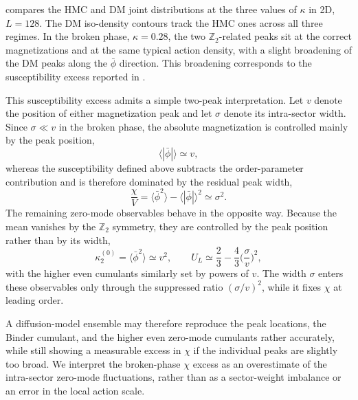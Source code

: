 \documentclass[reprint,twocolumn,superscriptaddress,preprintnumbers,amsmath,amssymb,aps,prd,floatfix]{revtex4-2}
\begin{document}
 compares the HMC and DM joint distributions at the three values of $\kappa$ in 2D, $L=128$. The DM iso-density contours track the HMC ones across all three regimes. In the broken phase, $\kappa=0.28$, the two $\mathbb{Z}_2$-related peaks sit at the correct magnetizations and at the same typical action density, with a slight broadening of the DM peaks along the $\bar\phi$ direction. This broadening corresponds to the susceptibility excess reported in .

This susceptibility excess admits a simple two-peak interpretation. Let $v$ denote the position of either magnetization peak and let $\sigma$ denote its intra-sector width. Since $\sigma\ll v$ in the broken phase, the absolute magnetization is controlled mainly by the peak position,
\begin{equation}
  \langle |\bar\phi| \rangle \simeq v,
\end{equation}
whereas the susceptibility defined above subtracts the order-parameter contribution and is therefore dominated by the residual peak width,
\begin{equation}
  \frac{\chi}{V}
  =
  \langle \bar\phi^2\rangle
  -
  \langle |\bar\phi|\rangle^2
  \simeq
  \sigma^2 .
\end{equation}
The remaining zero-mode observables behave in the opposite way. Because the mean vanishes by the $\mathbb{Z}_2$ symmetry, they are controlled by the peak position rather than by its width,
\begin{equation}
\kappa^{(0)}_2 = \langle\bar\phi^2\rangle \simeq v^2,
\qquad
U_L \simeq \frac{2}{3} - \frac{4}{3}\Big(\frac{\sigma}{v}\Big)^2 ,
\end{equation}
with the higher even cumulants similarly set by powers of $v$. The width $\sigma$ enters these observables only through the suppressed ratio $(\sigma/v)^2$, while it fixes $\chi$ at leading order.

A diffusion-model ensemble may therefore reproduce the peak locations, the Binder cumulant, and the higher even zero-mode cumulants rather accurately, while still showing a measurable excess in $\chi$ if the individual peaks are slightly too broad. We interpret the broken-phase $\chi$ excess as an overestimate of the intra-sector zero-mode fluctuations, rather than as a sector-weight imbalance or an error in the local action scale.
\end{document}
